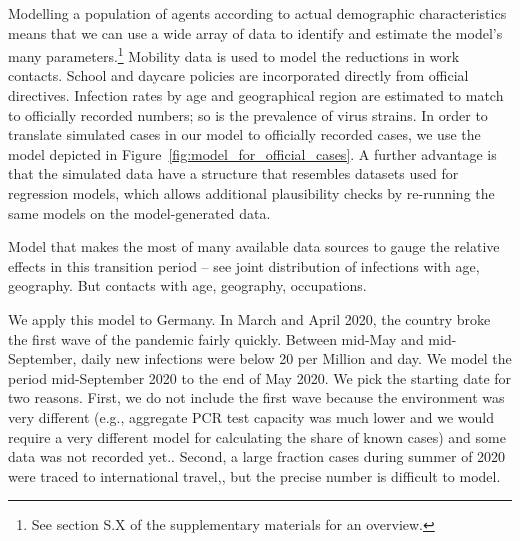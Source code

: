 Modelling a population of agents according to actual demographic characteristics means
that we can use a wide array of data to identify and estimate the model's many
parameters.\footnote{See section S.X of the supplementary materials for an
overview.} Mobility data is used to
model the reductions in work contacts. School and daycare policies are incorporated
directly from official directives. Infection rates by age and geographical region are
estimated to match to officially recorded numbers; so is the prevalence of virus strains.
In order to translate simulated cases in our model to officially recorded cases, we use
the model depicted in Figure~\ref{fig:model_for_official_cases}.  A further advantage is that the simulated data have a structure that resembles
datasets used for regression models, which allows additional plausibility checks by
re-running the same models on the model-generated data.

Model that makes the most of many available data sources to gauge the relative effects in
this transition period -- see joint distribution of infections with age, geography. But
contacts with age, geography, occupations.

We apply this model to Germany. In March and April 2020, the country broke the first wave
of the pandemic fairly quickly. Between mid-May and mid-September, daily new infections
were below 20 per Million and day. We model the
period mid-September 2020 to the end of May 2020. We pick the starting date for two
reasons. First, we do not include the first wave because the environment was very
different (e.g., aggregate PCR test capacity was much lower and we would require a very
different model for calculating the share of known cases) and some data was not recorded
yet.. Second, a
large fraction cases during summer of 2020 were traced to international
travel,, but the precise number is difficult to model.

